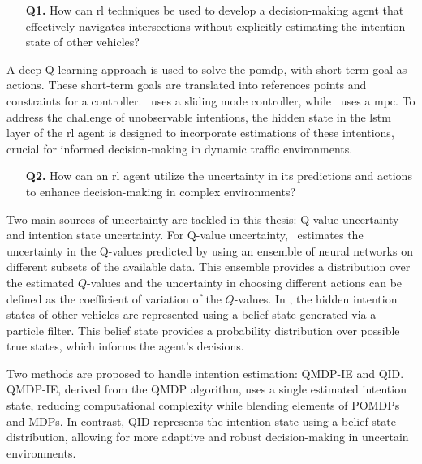 \begin{enumerate}
	\item[\textbf{Q1.}] How can \gls{rl} techniques be used to develop a decision-making agent that effectively navigates intersections without explicitly estimating the intention state of other vehicles?
\end{enumerate}
A deep Q-learning approach is used to solve the \gls{pomdp}, with short-term goal as actions. These short-term goals are translated into references points and constraints for a controller. \paperLSTM \ uses a sliding mode controller, while \paperMPC \ uses a \gls{mpc}.
To address the challenge of unobservable intentions, the hidden state in the \gls{lstm} layer of the \gls{rl} agent is designed to incorporate estimations of these intentions, crucial for informed decision-making in dynamic traffic environments. 

\begin{enumerate}
	\item[\textbf{Q2.}] How can an \gls{rl} agent utilize the uncertainty in its predictions and actions to enhance decision-making in complex environments? 
\end{enumerate}
Two main sources of uncertainty are tackled in this thesis: Q-value uncertainty and intention state uncertainty.
For Q-value uncertainty, \paperEnsamble \ estimates the uncertainty in the Q-values predicted by using an ensemble of neural networks on different subsets of the available data. This ensemble provides a distribution over the estimated $Q$-values and the uncertainty in choosing different actions can be defined as the coefficient of variation of the $Q$-values.
In \paperBelief, the hidden intention states of other vehicles are represented using a belief state generated via a particle filter. This belief state provides a probability distribution over possible true states, which informs the agent's decisions.

Two methods are proposed to handle intention estimation: QMDP-IE and QID. QMDP-IE, derived from the QMDP algorithm, uses a single estimated intention state, reducing computational complexity while blending elements of POMDPs and MDPs. In contrast, QID represents the intention state using a belief state distribution, allowing for more adaptive and robust decision-making in uncertain environments.

